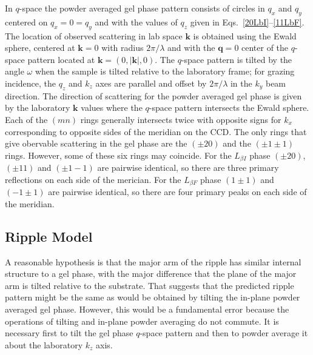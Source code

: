 In $q$-space the powder averaged gel phase pattern consists of circles 
in $q_x$ and $q_y$ centered on $q_x=0=q_y$ and with the values of $q_z$ given 
in Eqs.~\ref{20LbI}--\ref{11LbF}.  
The location of observed scattering in lab space $\mathbf{k}$ is obtained using 
the Ewald sphere, centered at $\mathbf{k}=0$ with radius $2\pi/\lambda$ and with 
the $\mathbf{q}=0$ center of the $q$-space pattern located 
at $\mathbf{k}=(0,|\mathbf{k}|,0)$.  The $q$-space pattern is tilted by the 
angle $\omega$ when the sample is tilted relative to the laboratory frame; for 
grazing incidence, the $q_z$ and $k_z$ axes are parallel and offset 
by $2\pi/\lambda$ in the $k_y$ beam direction.  The direction of scattering for 
the powder averaged gel phase is given by the laboratory $\mathbf{k}$ values 
where the $q$-space pattern intersects the Ewald sphere.  Each of the $(mn)$ 
rings generally intersects twice with opposite signs for $k_x$ corresponding to 
opposite sides of the meridian on the CCD.  The only rings that give obervable 
scattering in the gel phase are the $(\pm20)$ and the $(\pm1\pm1)$ rings.  
However, some of these six rings may coincide. For the $L_{{\beta}I}$ phase 
$(\pm20)$, $(\pm11)$ and $(\pm1-1)$ are pairwise identical, so there are three 
primary reflections on each side of the merician. For the $L_{{\beta}F}$ phase 
$(1\pm1)$ and $(-1\pm1)$ are pairwise identical, so there are four primary peaks 
on each side of the meridian.

\subsection{Ripple Model}\label{sec:ripple_model}
A reasonable hypothesis is that the major arm of the ripple has similar 
internal structure to a gel phase, with the major   difference that the plane 
of the major arm is tilted relative to the substrate.  That suggests that the 
predicted ripple pattern might be the same as would be obtained by tilting the 
in-plane powder averaged gel phase.  However, this would be a fundamental error 
because the operations of tilting and in-plane powder averaging do not commute.  
It is necessary first to tilt the gel phase $q$-space pattern and then to 
powder average it about the laboratory $k_z$ axis.  

